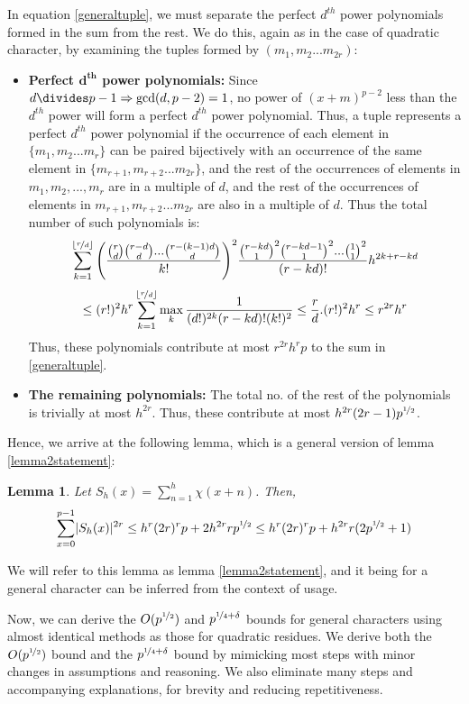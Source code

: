 \documentclass{report}
\newtheorem*{lemma*}{Lemma}
\begin{document}
In equation \ref{generaltuple}, we must separate the perfect $d^{th}$ power polynomials formed in the sum from the rest. We do this, again as in the case of quadratic character, by examining the tuples formed by $(m_1, m_2...m_{2r})$:
\begin{itemize}
\item \textbf{Perfect $\boldsymbol{d^{th}}$ power polynomials:} Since $d \divides p-1\Rightarrow \gcd(d, p-2)=1$, no power of $(x+m)^{p-2}$ less than the $d^{th}$ power will form a perfect $d^{th}$ power polynomial. Thus, a tuple represents a perfect $d^{th}$ power polynomial if the occurrence of each element in $\{m_1, m_2...m_{r}\}$ can be paired bijectively with an occurrence of the same element in $\{m_{r+1}, m_{r+2}...m_{2r}\}$, and the rest of the occurrences of elements in $m_1, m_2,...,m_{r}$ are in a multiple of $d$, and the rest of the occurrences of elements in $m_{r+1}, m_{r+2}...m_{2r}$ are also in a multiple of $d$. Thus the total number of such polynomials is:
$$\sum_{k=1}^{\lfloor\nicefrac{r}{d}\rfloor}\Bigg(\frac{\binom{r}{d}\binom{r-d}{d}...\binom{r-(k-1)d}{d}}{k!}\Bigg)^2\frac{\binom{r-kd}{1}^2\binom{r-kd-1}{1}^2...\binom{1}{1}^2}{(r-kd)!}h^{2k+r-kd}$$
\[
\leq (r!)^2 h^{r}\sum_{k=1}^{\lfloor\nicefrac{r}{d}\rfloor}\max_k \frac{1}{(d!)^{2k}(r-kd)!(k!)^2} \leq \frac{r}{d}.(r!)^2 h^{r} \leq r^{2r}h^r
\]
Thus, these polynomials contribute at most $r^{2r}h^rp$ to the sum in \ref{generaltuple}.
\item \textbf {The remaining polynomials:} The total no. of the rest of the polynomials is trivially at most $h^{2r}$. Thus, these contribute at most $h^{2r}(2r-1)p^{\nicefrac{1}{2}}$.
\end{itemize}
Hence, we arrive at the following lemma, which is a general version of lemma \ref{lemma2statement}:
\begin{lemma*}
Let $S_h(x)=\sum\limits_{n=1}^{h}\chi(x+n)$. Then,
\begin{equation} \label{lemma2gen}
\sum\limits_{x=0}^{p-1}\lvert S_h(x)\rvert^{2r}\leq h^{r}(2r)^{r}p+2h^{2r}rp^{\nicefrac{1}{2}}\leq h^{r}(2r)^{r}p+h^{2r}r(2p^{\nicefrac{1}{2}}+1)
\end{equation}
\end{lemma*}
We will refer to this lemma as lemma \ref{lemma2statement}, and it being for a general character can be inferred from the context of usage.

Now, we can derive the $O(p^{\nicefrac{1}{2}})$ and $p^{\nicefrac{1}{4}+\delta}$ bounds for general characters using almost identical methods as those for quadratic residues. We derive both the $O(p^{\nicefrac{1}{2}})$ bound and the $p^{\nicefrac{1}{4}+\delta}$ bound by mimicking most steps with minor changes in assumptions and reasoning. We also eliminate many steps and accompanying explanations, for brevity and reducing repetitiveness.
\end{document}
